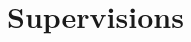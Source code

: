 \documentclass[letterpaper]{DS_class_file} %
\begin{document}
\begin{twenty}
	
	
\end{twenty}


\section{Supervisions}
\end{document}

